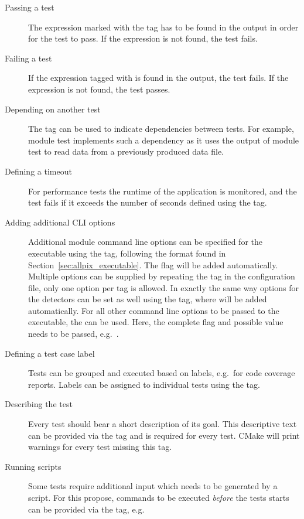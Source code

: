 \begin{description}
  \item[Passing a test] The expression marked with the tag  has to be found in the output in order for the test to pass. If the expression is not found, the test fails.
  \item[Failing a test] If the expression tagged with  is found in the output, the test fails. If the expression is not found, the test passes.
  \item[Depending on another test] The tag  can be used to indicate dependencies between tests. For example, module test  implements such a dependency as it uses the output of module test  to read data from a previously produced \apsq data file.
  \item[Defining a timeout] For performance tests the runtime of the application is monitored, and the test fails if it exceeds the number of seconds defined using the  tag.
  \item[Adding additional CLI options] Additional module command line options can be specified for the  executable using the  tag, following the format found in Section~\ref{sec:allpix_executable}. The  flag will be added automatically. Multiple options can be supplied by repeating the  tag in the configuration file, only one option per tag is allowed. In exactly the same way options for the detectors can be set as well using the  tag, where  will be added automatically.
  For all other command line options to be passed to the executable, the  can be used. Here, the complete flag and possible value needs to be passed, e.g.\ .
  \item[Defining a test case label] Tests can be grouped and executed based on labels, e.g.\ for code coverage reports. Labels can be assigned to individual tests using the  tag.
  \item[Describing the test] Every test should bear a short description of its goal. This descriptive text can be provided via the  tag and is required for every test. CMake will print warnings for every test missing this tag.
  \item[Running scripts] Some tests require additional input which needs to be generated by a script. For this propose, commands to be executed \emph{before} the tests starts can be provided via the  tag, e.g.

\end{description}
